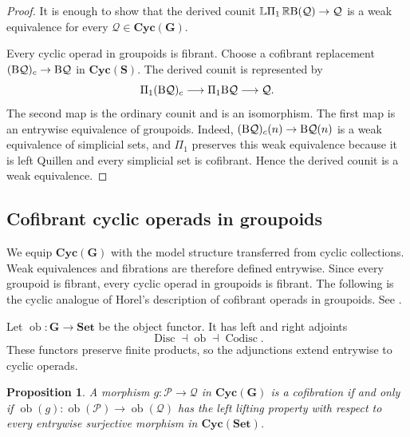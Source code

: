 \documentclass{amsart}
\newcommand{\calQ}{\mathcal{Q}}
\newcommand{\sSet}{\mathbf{S}}
\newcommand{\Set}{\mathbf{Set}}
\newcommand{\Grpd}{\mathbf{G}}
\newcommand{\Cyc}{\mathbf{Cyc}}
\newcommand{\ob}{\operatorname{ob}}
\newcommand{\cs}{\textnormal{B}}
\newtheorem{prop}[theorem]{Proposition}%
\theoremstyle{definition}
\numberwithin{equation}{section}
\begin{document}
\begin{proof}
It is enough to show that the derived counit
$\mathbb L\Pi_1\,\mathbb R\cs(\calQ)\to\calQ$ is a weak equivalence
for every $\calQ\in\Cyc(\Grpd)$.

Every cyclic operad in groupoids is fibrant. Choose a cofibrant
replacement $(\cs\calQ)_c\to\cs\calQ$ in $\Cyc(\sSet)$. The derived
counit is represented by
\[
\Pi_1(\cs\calQ)_c
\longrightarrow
\Pi_1\cs\calQ
\longrightarrow
\calQ.
\]
The second map is the ordinary counit and is an isomorphism. The
first map is an entrywise equivalence of groupoids. Indeed,
$(\cs\calQ)_c(n)\to\cs\calQ(n)$ is a weak equivalence of simplicial sets,
and $\Pi_1$ preserves this weak equivalence because it is left
Quillen and every simplicial set is cofibrant. Hence the derived
counit is a weak equivalence.
\end{proof}

\subsection{Cofibrant cyclic operads in groupoids}
\label{subsec: cofibrancy in grpd}

We equip $\Cyc(\Grpd)$ with the model structure transferred from
cyclic collections. Weak equivalences and fibrations are therefore
defined entrywise. Since every groupoid is fibrant, every cyclic
operad in groupoids is fibrant. The following is the cyclic analogue
of Horel's description of cofibrant operads in groupoids. See
\cite[Proposition~6.8]{Horel_profinite_groupoids}.

Let $\ob\colon\Grpd\to\Set$ be the object functor. It has left and
right adjoints
\[
\operatorname{Disc}\dashv\ob\dashv\operatorname{Codisc}.
\]
These functors preserve finite products, so the adjunctions extend
entrywise to cyclic operads.

\begin{prop}
\label{prop:cofibrations-cyc}
A morphism $g\colon\mathcal P\to\mathcal Q$ in $\Cyc(\Grpd)$ is a
cofibration if and only if
$\ob(g)\colon\ob(\mathcal P)\to\ob(\mathcal Q)$ has the left lifting
property with respect to every entrywise surjective morphism in
$\Cyc(\Set)$.
\end{prop}
\end{document}
